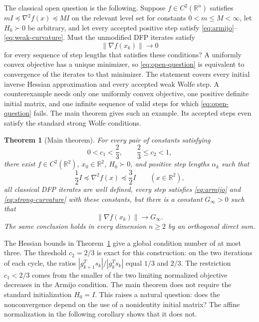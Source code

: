 \documentclass[11pt]{article}
\newtheorem{theorem}{Theorem}
\newcommand{\R}{\mathbb R}
\begin{document}
The classical open question is the following.  Suppose
$f\in C^2(\R^n)$ satisfies
$mI\preceq\nabla^2f(x)\preceq MI$ on the relevant level set for constants
$0<m\le M<\infty$, let $H_0\succ0$ be arbitrary, and let every accepted
positive step satisfy \eqref{eq:armijo}--\eqref{eq:weak-curvature}.  Must the
unmodified DFP iterates satisfy
\begin{equation}\label{eq:open-question}
\|\nabla f(x_k)\|\longrightarrow0
\end{equation}
for every sequence of step lengths that satisfies these conditions?  A
uniformly convex objective has a unique minimizer, so
\eqref{eq:open-question} is equivalent to
convergence of the iterates to that minimizer.  The statement covers every
initial inverse Hessian approximation and every accepted weak Wolfe step.  A
counterexample needs only one uniformly convex objective, one positive
definite initial matrix, and one infinite sequence of valid steps for which
\eqref{eq:open-question} fails.  The main theorem gives such an example.  Its
accepted steps even satisfy the standard strong Wolfe conditions.

\begin{theorem}[Main theorem]\label{thm:main}
For every pair of constants satisfying
\begin{equation}\label{eq:wolfe-range}
0<c_1<\frac23,\qquad \frac23\le c_2<1,
\end{equation}
there exist $f\in C^2(\R^2)$, $x_0\in\R^2$, $H_0\succ0$, and positive step
lengths $\alpha_k$ such that
\[
\frac12I\preceq\nabla^2f(x)\preceq\frac32I
\qquad(x\in\R^2),
\]
all classical DFP iterates are well defined, every step satisfies
\eqref{eq:armijo} and \eqref{eq:strong-curvature} with these constants, but
there is a constant $G_\infty>0$ such that
\[
\|\nabla f(x_k)\|\longrightarrow G_\infty.
\]
The same conclusion holds in every dimension $n\ge2$ by an orthogonal direct
sum.
\end{theorem}

The Hessian bounds in Theorem~\ref{thm:main} give a global condition number of
at most three.  The threshold $c_2=2/3$ is exact for this construction: on the
two iterations of each cycle, the ratios
$|g_{k+1}^Ts_k|/|g_k^Ts_k|$ equal $1/3$ and $2/3$.  The restriction $c_1<2/3$
comes from the smaller of the two limiting normalized objective decreases in
the Armijo condition.  The main theorem does not require the standard
initialization $H_0=I$.  This raises a natural question: does the
nonconvergence depend on the use of a nonidentity initial matrix?
The affine normalization in the following corollary shows that it does not.
\end{document}
